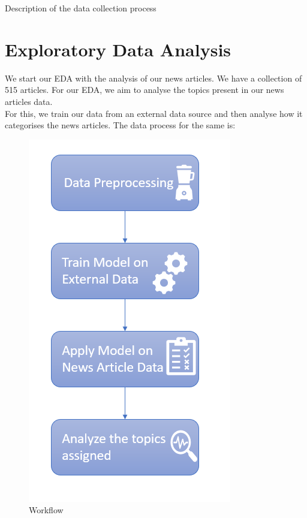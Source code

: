\documentclass{article}
\begin{document}
{Description of the data collection process}

\section{Exploratory Data Analysis}

We start our EDA with the analysis of our news articles. We have a collection of 515 articles. For our EDA, we aim to analyse the topics present in our news articles data. \\
 For this, we train our data from an external data source and then analyse how it categorises the news articles. The data process for the same is: \\

    

\begin{figure}[H]
\centering
\includegraphics[scale=1]{lda_eda_process.PNG}

\caption{Workflow}
\end{figure}
\end{document}
